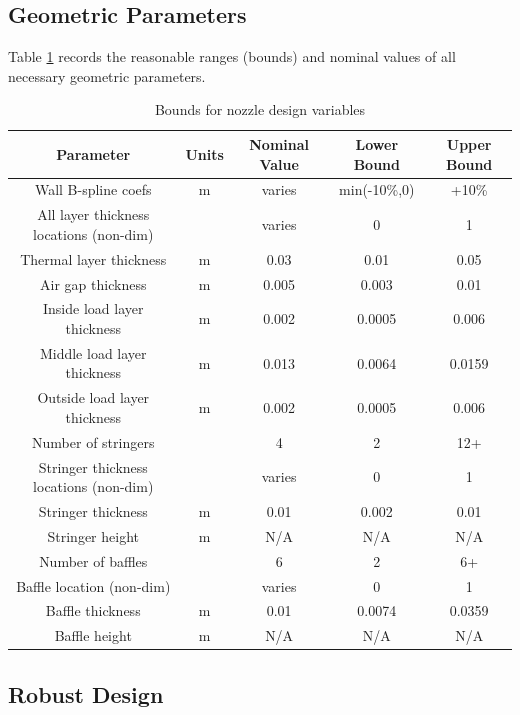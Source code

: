 \documentclass{article}
\begin{document}
\subsection{Geometric Parameters}

Table \ref{tab:geoParams} records the reasonable ranges (bounds) and nominal values of all necessary geometric parameters.

\begin{table}
\caption[Bounds for design variables]{Bounds for nozzle design variables}
\label{tab:geoParams}
\begin{center}
\begin{tabular}[]{ c | c | c | c | c}
\textbf{Parameter} & \textbf{Units} & \textbf{Nominal Value} & \textbf{Lower Bound} & \textbf{Upper Bound} \\ \hline
Wall B-spline coefs & m & varies & min(-10\%,0) & +10\% \\ \hline
All layer thickness locations (non-dim) & & varies & 0 & 1 \\ \hline
Thermal layer thickness & m & 0.03 & 0.01 & 0.05 \\ \hline
Air gap thickness & m & 0.005 & 0.003 & 0.01 \\ \hline
Inside load layer thickness & m & 0.002 & 0.0005 & 0.006 \\ \hline
Middle load layer thickness & m & 0.013 & 0.0064 & 0.0159 \\ \hline
Outside load layer thickness & m & 0.002 & 0.0005 & 0.006 \\ \hline
Number of stringers & & 4 & 2 & 12+ \\ \hline
Stringer thickness locations (non-dim) & & varies & 0 & 1 \\ \hline
Stringer thickness & m & 0.01 & 0.002 & 0.01 \\ \hline
Stringer height & m & N/A & N/A & N/A \\ \hline
Number of baffles & & 6 & 2 & 6+ \\ \hline
Baffle location (non-dim) &  & varies & 0 & 1 \\ \hline
Baffle thickness & m & 0.01 & 0.0074 & 0.0359 \\ \hline
Baffle height & m & N/A & N/A & N/A \\ \hline
\end{tabular}
\end{center}
\end{table}

\subsection{Robust Design}
\end{document}
